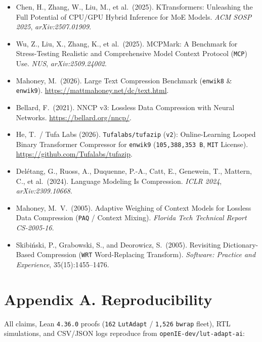 \documentclass[10pt]{article}
\begin{document}
{\begin{itemize}
  \item Chen, H., Zhang, W., Liu, M., et al.\ (2025). KTransformers: Unleashing the Full Potential of CPU/GPU Hybrid Inference for MoE Models. \emph{ACM SOSP 2025}, \emph{arXiv:2507.01909}.
  \item Wu, Z., Liu, X., Zhang, K., et al.\ (2025). MCPMark: A Benchmark for Stress-Testing Realistic and Comprehensive Model Context Protocol (\texttt{MCP}) Use. \emph{NUS}, \emph{arXiv:2509.24002}.
  \item Mahoney, M.\ (2026). Large Text Compression Benchmark (\texttt{enwik8} \& \texttt{enwik9}). \url{https://mattmahoney.net/dc/text.html}.
  \item Bellard, F.\ (2021). NNCP v3: Lossless Data Compression with Neural Networks. \url{https://bellard.org/nncp/}.
  \item He, T.\ / Tufa Labs (2026). \texttt{Tufalabs/tufazip} (\texttt{v2}): Online-Learning Looped Binary Transformer Compressor for \texttt{enwik9} (\texttt{105,388,353 B}, \texttt{MIT} License). \url{https://github.com/Tufalabs/tufazip}.
  \item Del\'etang, G., Ruoss, A., Duquenne, P.-A., Catt, E., Genewein, T., Mattern, C., et al.\ (2024). Language Modeling Is Compression. \emph{ICLR 2024}, \emph{arXiv:2309.10668}.
  \item Mahoney, M.\ V.\ (2005). Adaptive Weighing of Context Models for Lossless Data Compression (\texttt{PAQ} / Context Mixing). \emph{Florida Tech Technical Report CS-2005-16}.
  \item Skibi\'nski, P., Grabowski, S., and Deorowicz, S.\ (2005). Revisiting Dictionary-Based Compression (\texttt{WRT} Word-Replacing Transform). \emph{Software: Practice and Experience}, 35(15):1455--1476.
\end{itemize}
}

\section{Appendix A. Reproducibility}\label{reproducibility}

All claims, Lean \texttt{4.36.0} proofs (\texttt{162} \texttt{LutAdapt} / \texttt{1,526} \texttt{bwrap} fleet), RTL simulations, and CSV/JSON logs reproduce from \texttt{openIE-dev/lut-adapt-ai}:
\end{document}
